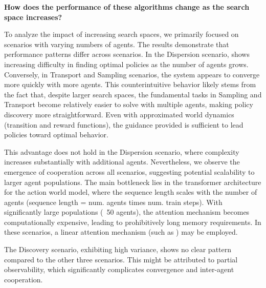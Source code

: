 \begin{center}
 \textbf{How does the performance of these algorithms change as the search space increases?}
\end{center}
To analyze the impact of increasing search spaces, we primarily focused on scenarios with varying numbers of agents. The results demonstrate that performance patterns differ across scenarios. In the Dispersion scenario, \fname{} shows increasing difficulty in finding optimal policies as the number of agents grows. Conversely, in Transport and Sampling scenarios, the system appears to converge more quickly with more agents. This counterintuitive behavior likely stems from the fact that, despite larger search spaces, the fundamental tasks in Sampling and Transport become relatively easier to solve with multiple agents, making policy discovery more straightforward. Even with approximated world dynamics (transition and reward functions), the guidance provided is sufficient to lead policies toward optimal behavior.

This advantage does not hold in the Dispersion scenario, where complexity increases substantially with additional agents. Nevertheless, we observe the emergence of cooperation across all scenarios, suggesting potential scalability to larger agent populations. The main bottleneck lies in the transformer architecture for the action world model, where the sequence length scales with the number of agents (sequence length = num. agents times num. train steps). With significantly large populations (~50 agents), the attention mechanism becomes computationally expensive, leading to prohibitively long memory requirements. In these scenarios, a linear attention mechanism (such as \cite{Beltagy20}) may be employed.

The Discovery scenario, exhibiting high variance, shows no clear pattern compared to the other three scenarios.
This might be attributed to partial observability, which significantly complicates convergence and inter-agent cooperation.
